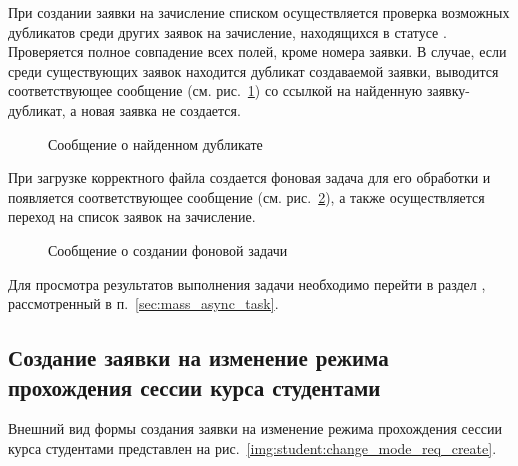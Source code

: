 При создании заявки на зачисление списком осуществляется проверка возможных дубликатов среди других заявок на зачисление,
находящихся в статусе . Проверяется полное совпадение всех полей, кроме номера заявки. 
В случае, если среди существующих заявок находится дубликат создаваемой заявки, выводится соответствующее сообщение 
(см. рис.~\ref{img:student:req_mass_enroll_duplicate_msg}) со ссылкой на найденную заявку-дубликат, 
а новая заявка не создается.

\begin{figure}[H]
	\caption{Сообщение о найденном дубликате}
	\label{img:student:req_mass_enroll_duplicate_msg}
\end{figure}


При загрузке корректного файла создается фоновая задача для его обработки и появляется соответствующее сообщение 
(см. рис.~\ref{img:student:req_mass_enroll_task}), а также осуществляется переход на список заявок на зачисление.

\begin{figure}[H]
	\caption{Сообщение о создании фоновой задачи}
	\label{img:student:req_mass_enroll_task}
\end{figure}
Для просмотра результатов выполнения задачи необходимо перейти в раздел , 
рассмотренный в п.~\ref{sec:mass_async_task}.

\subsection{Создание заявки на изменение режима прохождения сессии курса студентами}

Внешний вид формы создания заявки на изменение режима прохождения сессии курса студентами
представлен на рис.~\ref{img:student:change_mode_req_create}.

